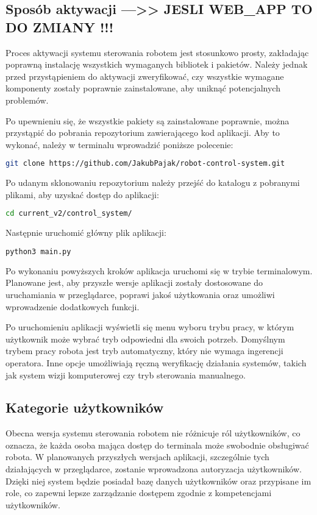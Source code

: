 \subsection{Sposób aktywacji --->> JESLI WEB_APP TO DO ZMIANY !!!}
\label{sekcja:43}
Proces aktywacji systemu sterowania robotem jest stosunkowo prosty, zakładając poprawną instalację wszystkich wymaganych bibliotek i pakietów. Należy jednak przed przystąpieniem do aktywacji zweryfikować, czy wszystkie wymagane komponenty zostały poprawnie zainstalowane, aby uniknąć potencjalnych problemów.

Po upewnieniu się, że wszystkie pakiety są zainstalowane poprawnie, można przystąpić do pobrania repozytorium zawierającego kod aplikacji. Aby to wykonać, należy w terminalu wprowadzić poniższe polecenie:

\begin{lstlisting}[language=bash]
    git clone https://github.com/JakubPajak/robot-control-system.git
\end{lstlisting}

Po udanym sklonowaniu repozytorium należy przejść do katalogu z pobranymi plikami, aby uzyskać dostęp do aplikacji:

\begin{lstlisting}[language=bash]
    cd current_v2/control_system/
\end{lstlisting}

Następnie uruchomić główny plik aplikacji:

\begin{lstlisting}[language=bash]
    python3 main.py
\end{lstlisting}

Po wykonaniu powyższych kroków aplikacja uruchomi się w trybie terminalowym. Planowane jest, aby przyszłe wersje aplikacji zostały dostosowane do uruchamiania w przeglądarce, poprawi jakoś użytkowania oraz umożliwi wprowadzenie dodatkowych funkcji.

Po uruchomieniu aplikacji wyświetli się menu wyboru trybu pracy, w którym użytkownik może wybrać tryb odpowiedni dla swoich potrzeb. Domyślnym trybem pracy robota jest tryb automatyczny, który nie wymaga ingerencji operatora. Inne opcje umożliwiają ręczną weryfikację działania systemów, takich jak system wizji komputerowej czy tryb sterowania manualnego.

\subsection{Kategorie użytkowników}
Obecna wersja systemu sterowania robotem nie różnicuje ról użytkowników, co oznacza, że każda osoba mająca dostęp do terminala może swobodnie obsługiwać robota. W planowanych przyszłych wersjach aplikacji, szczególnie tych działających w przeglądarce, zostanie wprowadzona autoryzacja użytkowników. Dzięki niej system będzie posiadał bazę danych użytkowników oraz przypisane im role, co zapewni lepsze zarządzanie dostępem zgodnie z kompetencjami użytkowników.

